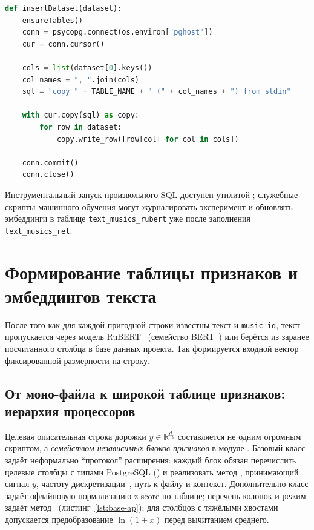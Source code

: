 \begin{lstlisting}[language=Python, caption={Фрагмент \texttt{csv\_sync\_db.py}: пакетная загрузка датасета в PostgreSQL методом \texttt{copy}.},label=lst:copy-insert]
def insertDataset(dataset):
    ensureTables()
    conn = psycopg.connect(os.environ["pghost"])
    cur = conn.cursor()

    cols = list(dataset[0].keys())
    col_names = ", ".join(cols)
    sql = "copy " + TABLE_NAME + " (" + col_names + ") from stdin"

    with cur.copy(sql) as copy:
        for row in dataset:
            copy.write_row([row[col] for col in cols])

    conn.commit()
    conn.close()
\end{lstlisting}

Инструментальный запуск произвольного SQL доступен утилитой ; служебные скрипты машинного обучения могут журналировать эксперимент и обновлять эмбеддинги в таблице \texttt{text\_musics\_rubert} уже после заполнения \texttt{text\_musics\_rel}.

\section{Формирование таблицы признаков и эмбеддингов текста}

После того как для каждой пригодной строки известны текст и \texttt{music\_id}, текст пропускается через модель RuBERT~\cite{kuratov2019} (семейство BERT~\cite{devlin2018}) или берётся из заранее посчитанного столбца в базе данных проекта. Так формируется входной вектор фиксированной размерности на строку.

\subsection{От моно-файла к широкой таблице признаков: иерархия процессоров}

\begin{sloppypar}
Целевая описательная строка дорожки $y\in\mathbb{R}^{d_y}$ составляется не одним огромным скриптом, а \textit{семейством независимых блоков признаков} в модуле . Базовый класс  задаёт неформально ``протокол'' расширения: каждый блок обязан перечислить целевые столбцы с типами PostgreSQL () и реализовать метод , принимающий сигнал $y$, частоту дискретизации~, путь к файлу и контекст. Дополнительно класс задаёт офлайновую нормализацию z-score по таблице; перечень колонок и режим задаёт метод ~(листинг~\ref{lst:base-ap}); для столбцов с тяжёлыми хвостами допускается предобразование $\ln(1+x)$ перед вычитанием среднего\@.
\end{sloppypar}

